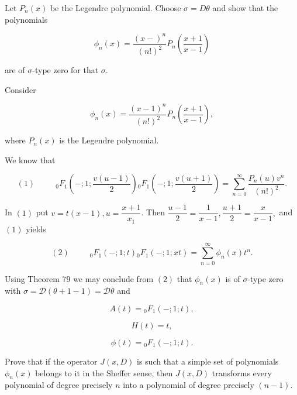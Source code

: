 \begin{problem}\label{problem11chapter13}
Let $P_n(x)$ be the Legendre polynomial. Choose $\sigma=D\theta$ and show that the polynomials 

$$\phi_n(x) = \dfrac{(x-)^n}{(n!)^2} P_n \left( \dfrac{x+1}{x-1} \right)$$

are of $\sigma$-type zero for that $\sigma$.
\end{problem}
\begin{solution}
Consider

$$\phi_n(x) = \dfrac{(x-1)^n}{(n!)^2} P_n \left( \dfrac{x+1}{x-1} \right),$$

where $P_n(x)$ is the Legendre polynomial.

We know that

$$(1) \hspace{30pt} {}_0F_1 \left(-;1;\dfrac{v(u-1)}{2} \right) {}_0F_1 \left(-;1;\dfrac{v(u+1)}{2} \right) = \displaystyle\sum_{n=0}^{\infty} \dfrac{P_n(u) v^n}{(n!)^2}.$$

In $(1)$ put $v=t(x-1), u=\dfrac{x+1}{x_1}$. Then $\dfrac{u-1}{2}=\dfrac{1}{x-1}, \dfrac{u+1}{2}=\dfrac{x}{x-1},$ and $(1)$ yields 

$$(2) \hspace{30pt} {}_0F_1(-;1;t){}_0F_1(-;1;xt) = \displaystyle\sum_{n=0}^{\infty} \phi_n(x) t^n.$$

Using Theorem 79 we may conclude from $(2)$ that $\phi_n(x)$ is of $\sigma$-type zero with $\sigma=\mathscr{D}(\theta+1-1) =\mathscr{D}\theta$ and 

$$A(t) = {}_0F_1(-;1;t),$$

$$H(t) = t,$$

$$\phi(t) = {}_0F_1(-;1;t).$$
\end{solution}
\begin{problem}\label{problem12chapter13}
Prove that if the operator $J(x,D)$ is such that a simple set of polynomials $\phi_n(x)$ belongs to it in the Sheffer sense, then $J(x,D)$ transforms every polynomial of degree precisely $n$ into a polynomial of degree precisely $(n-1)$.
\end{problem}
